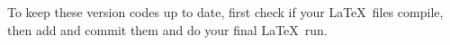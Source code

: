 
To keep these version codes up to date, first check if your \LaTeX\  files compile,
then add and commit them and do your final \LaTeX\  run. 




